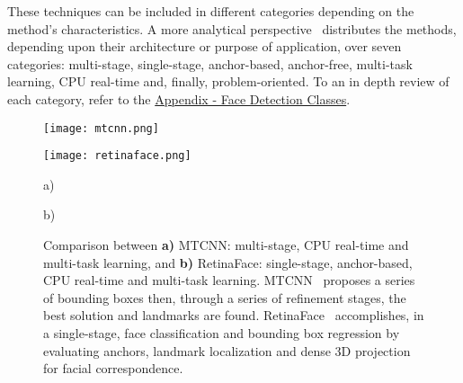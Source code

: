 \documentclass[class=report, crop=false, a4paper, 12pt]{standalone}
\begin{document}
\par These techniques can be included in different categories depending on the method's characteristics. A more analytical perspective~\autocite{duElementsEndtoendDeep2022} distributes the methods, depending upon their architecture or purpose of application, over seven categories: multi-stage, single-stage, anchor-based, anchor-free, multi-task learning, CPU real-time and, finally, problem-oriented. To an in depth review of each category, refer to the \hyperref[sec:face_detection_appendix]{Appendix - Face Detection Classes}.

\vspace{0.5\baselineskip}
\begin{figure}[h!]
    \centering
    \begin{minipage}[c]{0.38\textwidth}
      \centering
      \texttt{[image: mtcnn.png]}
      \label{fig:mtcnn}
    \end{minipage}
    \hspace{0.5cm}
    \begin{minipage}[c]{0.52\textwidth}
      \centering
      \texttt{[image: retinaface.png]}
      \label{fig:retinaface}
    \end{minipage} 
    \begin{minipage}{0.4\textwidth}
        \vspace{-0.5cm}
        \centering
        \footnotesize a)
    \end{minipage}
    \hfill
    \begin{minipage}{0.4\textwidth}
        \vspace{-0.5cm}
        \centering
        \footnotesize b)
    \end{minipage}
    \vspace{-0.4cm}
    \caption{Comparison between \textbf{a)} MTCNN: multi-stage, CPU real-time and multi-task learning, and \textbf{b)} RetinaFace: single-stage, anchor-based, CPU real-time and multi-task learning. MTCNN~\autocite{zhangJointFaceDetection2016a} proposes a series of bounding boxes then, through a series of refinement stages, the best solution and landmarks are found. RetinaFace~\autocite{dengRetinaFaceSinglestageDense2019} accomplishes, in a single-stage, face classification and bounding box regression by evaluating anchors, landmark localization and dense 3D projection for facial correspondence.}
    \label{fig:mtcnn vs retinaface}
\end{figure}
\end{document}
